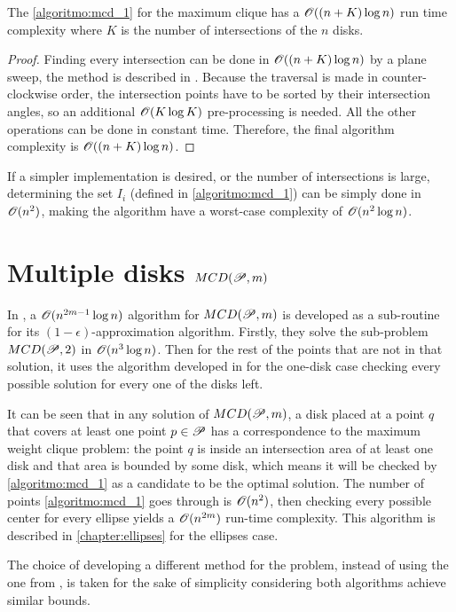 \begin{lema}\label{lema:disk}
The \autoref{algoritmo:mcd_1} for the maximum clique has a $\mathscr{O}((n+K)\log{n})$ run time complexity where $K$ is the number of intersections of the $n$ disks.
\end{lema}

\begin{proof}
    Finding every intersection can be done in $\mathscr{O}((n+K)\log{n})$  by a plane sweep, the method is described in \cite{bentley:1979}. 
    Because the traversal is made in counter-clockwise order, the intersection points have to be sorted by their intersection angles, so an additional $\mathscr{O}(K\log{K})$ pre-processing is needed. All the other operations can be done in constant time. Therefore, the final algorithm complexity is $\mathscr{O}((n+K)\log{n})$.
\end{proof}

If a simpler implementation is desired, or the number of intersections is large, determining the set $I_i$ (defined in \autoref{algoritmo:mcd_1}) can be simply done in $\mathscr{O}(n^2)$, making the algorithm have a worst-case complexity of $\mathscr{O}(n^2\log{n})$.

\section{Multiple disks $MCD(\mathscr{P}, m)$}


In \cite{cabello:2006}, a $\mathscr{O}(n^{2m-1}\log{n})$ algorithm for $MCD(\mathscr{P}, m)$ is developed as a sub-routine for its $(1-\epsilon)$-approximation algorithm. Firstly, they solve the sub-problem $MCD(\mathscr{P}, 2)$ in $\mathscr{O}(n^3\log{n})$. Then for the rest of the points that are not in that solution, it uses the algorithm developed in \cite{chazelle:1986} for the one-disk case checking every possible solution for every one of the disks left.

It can be seen that in any solution of $MCD(\mathscr{P}, m)$, a disk placed at a point $q$ that covers at least one point $p \in \mathscr{P}$ has a correspondence to the maximum weight clique problem: the point $q$ is inside an intersection area of at least one disk and that area is bounded by some disk, which means it will be checked by \autoref{algoritmo:mcd_1} as a candidate to be the optimal solution. The number of points \autoref{algoritmo:mcd_1} goes through is $\mathscr{O}(n^2)$, then checking every possible center for every ellipse yields a $\mathscr{O}(n^{2m})$ run-time complexity.
This algorithm is described in \autoref{chapter:ellipses} for the ellipses case.

The choice of developing a different method for the problem, instead of using the one from \cite{cabello:2006}, is taken for the sake of simplicity considering both algorithms achieve similar bounds.